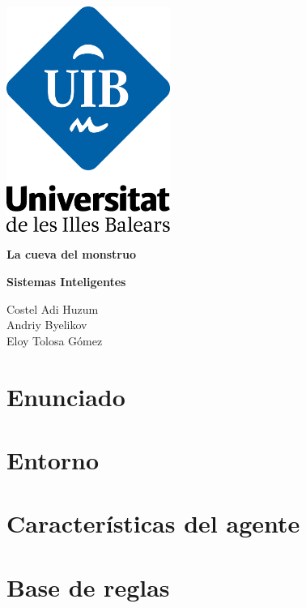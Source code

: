 \documentclass[12pt]{report}
\begin{document}
\begin{titlepage}
    \begin{center}
 
 
 
        \includegraphics[width=0.4\textwidth]{logo}
        
        \vspace*{1cm}
 
        \vspace{0.5cm}
 
        \vspace{1.5cm}
        
        \Huge
        \textbf{La cueva del monstruo}
        
        \vfill
 
        \Large
        
        \textbf{Sistemas Inteligentes}\\
        
        \vspace{1.5cm}
        
        Costel Adi Huzum\\
        Andriy Byelikov\\
        Eloy Tolosa Gómez

    \end{center}
\end{titlepage}

\tableofcontents

\chapter{Enunciado}


\chapter{Entorno}


\chapter{Características del agente}


\chapter{Base de reglas}

\end{document}

